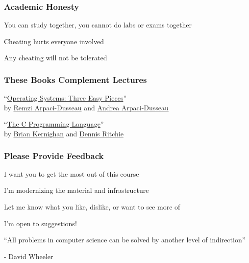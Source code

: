   \begin{frame}
    \frametitle{Academic Honesty}

    You can study together, you cannot do labs or exams together

    \vspace{2em}

    Cheating hurts everyone involved

    \vspace{2em}

    Any cheating will not be tolerated
  \end{frame}

  \begin{frame}
    \frametitle{These Books Complement Lectures}

    ``\href{https://pages.cs.wisc.edu/~remzi/OSTEP/}
           {Operating Systems: Three Easy Pieces}'' \\
    by \href{http://www.cs.wisc.edu/~remzi/}{Remzi Arpaci-Dusseau}
    and \href{http://www.cs.wisc.edu/~dusseau/}{Andrea Arpaci-Dusseau}

    \vspace{2em}

    ``\href{https://en.wikipedia.org/wiki/The_C_Programming_Language}
           {The C Programming Language}'' \\
    by \href{https://en.wikipedia.org/wiki/Brian_Kernighan}{Brian Kernighan}
    and \href{https://en.wikipedia.org/wiki/Dennis_Ritchie}{Dennis Ritchie}
  \end{frame}

  \begin{frame}
    \frametitle{Please Provide Feedback}

    I want you to get the most out of this course

    \vspace{2em}

    I'm modernizing the material and infrastructure

    \vspace{2em}

    Let me know what you like, dislike, or want to see more of

    \vspace{2em}

    I'm open to suggestions!
  \end{frame}
  
  \begin{frame}
    \vfill
    ``All problems in computer science can be solved by another level of
    indirection''

    \begin{flushright}
      - David Wheeler
    \end{flushright}
    \vfill
  \end{frame}

